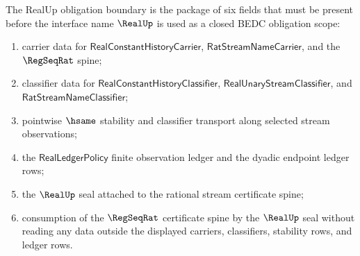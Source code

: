\begin{definition}
\label{def:realup-obligation-boundary}
The RealUp obligation boundary is the package of six fields that must be
present before the interface name $\RealUp$ is used as a closed BEDC
obligation scope:
\begin{enumerate}
\item carrier data for $\mathsf{RealConstantHistoryCarrier}$,
$\mathsf{RatStreamNameCarrier}$, and the $\RegSeqRat$ spine;
\item classifier data for $\mathsf{RealConstantHistoryClassifier}$,
$\mathsf{RealUnaryStreamClassifier}$, and
$\mathsf{RatStreamNameClassifier}$;
\item pointwise $\hsame$ stability and classifier transport along selected
stream observations;
\item the $\mathsf{RealLedgerPolicy}$ finite observation ledger and the
dyadic endpoint ledger rows;
\item the $\RealUp$ seal attached to the rational stream certificate spine;
\item consumption of the $\RegSeqRat$ certificate spine by the $\RealUp$ seal
without reading any data outside the displayed carriers, classifiers,
stability rows, and ledger rows.
\end{enumerate}
\end{definition}

